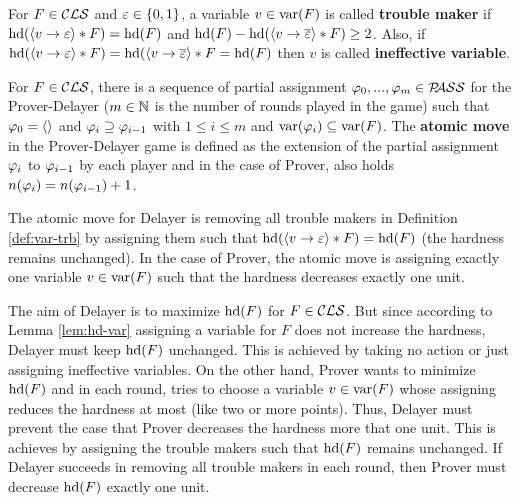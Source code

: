 \documentclass{report}
\begin{document}
\begin{defi}\label{def:var-trb}
For $F \in \mathcal{CLS}$ and  $\varepsilon \in \{ 0,1 \}$, a variable $v \in \operatorname{var}(F)$ is called \textbf{trouble maker} if $\operatorname{hd}(\langle v \rightarrow \varepsilon \rangle*F)=\operatorname{hd}(F)$ and $\operatorname{hd}(F)- \operatorname{hd}(\langle v \rightarrow \overline {\varepsilon} \rangle*F) \geq 2$. Also, if $\operatorname{hd}(\langle v \rightarrow \varepsilon \rangle*F)=\operatorname{hd}(\langle v \rightarrow \overline {\varepsilon} \rangle*F = \operatorname{hd}(F)$ then $v$ is called \textbf{ineffective variable}.
\end{defi}

\begin{defi}\label{def:atomicm}
For $F \in \mathcal{CLS}$, there is a sequence of partial assignment $\varphi_0, ..., \varphi_m \in \mathcal{P\hspace{-0.32em}ASS}$ for the Prover-Delayer ($m \in \mathbb{N}$ is the number of rounds played in the game) such that $\varphi_0=\langle  \rangle$ and $\varphi_i \supseteq \varphi_{i-1}$ with $1 \le i \le m$ and $\operatorname{var}(\varphi_i) \subseteq \operatorname{var}(F)$. The \textbf{atomic move} in the Prover-Delayer game is defined as the extension of the partial assignment $\varphi_i $ to $\varphi_{i-1}$ by each player and in the case of Prover, also holds $n(\varphi_i)=n( \varphi_{i-1})+1$.
\end{defi}

\begin{lem}\label{lem:atm-m-D-P}
The atomic move for Delayer is removing all trouble makers in Definition \ref{def:var-trb} by assigning them such that $\operatorname{hd}(\langle v \rightarrow \varepsilon \rangle*F)=\operatorname{hd}(F)$ (the hardness remains unchanged). In the case of Prover, the atomic move is assigning exactly one variable $v \in \operatorname{var}(F)$ such that the hardness decreases exactly one unit.
\end{lem}
\begin{prf}
The aim of Delayer is to maximize $\operatorname{hd}(F)$ for $F \in \mathcal{CLS}$. But since according to Lemma \ref{lem:hd-var} assigning a variable for $F$ does not increase the hardness, Delayer must keep $\operatorname{hd}(F)$ unchanged. This is achieved by taking no action or just assigning  ineffective variables. On the other hand, Prover wants to minimize $\operatorname{hd}(F)$ and in each round, tries to choose a variable $v \in \operatorname{var}(F)$ whose assigning reduces the hardness at most (like two or more points). Thus, Delayer must prevent the case that Prover decreases the hardness more that one unit. This is achieves by assigning the trouble makers such that $\operatorname{hd}(F)$ remains unchanged. If Delayer succeeds in removing all trouble makers in each round, then Prover must decrease $\operatorname{hd}(F)$ exactly one unit.
\end{prf}
\end{document}
